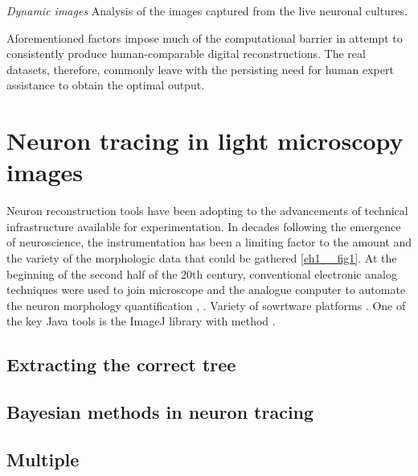 \textit{Dynamic images} Analysis of the images captured from the live neuronal cultures.

Aforementioned factors impose much of the computational barrier \cite{peng2011proof,svoboda2011past} in attempt to consistently produce human-comparable digital reconstructions. The real datasets, therefore, commonly leave with the persisting need for human expert assistance to obtain the optimal output. 

\section{Neuron tracing in light microscopy images}
Neuron reconstruction tools have been adopting to the advancements of technical infrastructure available for experimentation. In decades following the emergence of neuroscience, the instrumentation has been a limiting factor to the amount and the variety of the morphologic data that could be gathered \ref{ch1__fig1}. At the beginning of the second half of the 20th century, conventional electronic analog techniques were used to join microscope and the analogue computer to automate the neuron morphology quantification \cite{glaser1965semi},  \cite{capowski1981accurate}. Variety of sowrtware platforms \cite{meijering2010neuron,acciai2016automated}. One of the key Java tools is the ImageJ library \cite{abramoff2004image} with method \cite{longair2011simple,pool2008neuritetracer}. 

\subsection{Extracting the correct tree}

\subsection{Bayesian methods in neuron tracing}

\subsection{Multiple}


